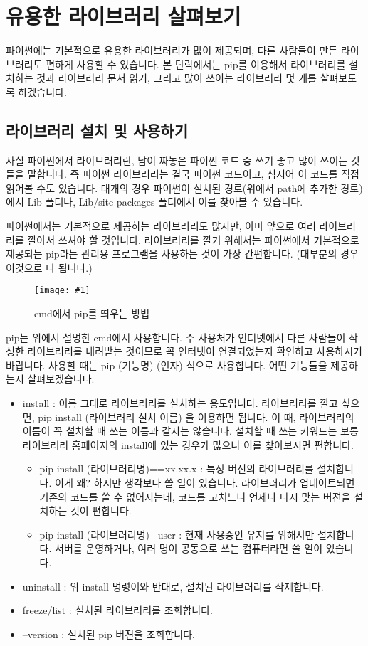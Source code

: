 \documentclass[twoside]{article}
\newcommand\fig[2]{
\begin{figure}[h]
  \centering
  \texttt{[image: \#1]}
  \caption{#2} 
  \label{fig:#1}
\end{figure}
}
\begin{document}
\section{유용한 라이브러리 살펴보기} 

파이썬에는 기본적으로 유용한 라이브러리가 많이 제공되며, 다른 사람들이 만든 라이브러리도 편하게 사용할 수 있습니다. 본 단락에서는 pip를 이용해서 라이브러리를 설치하는 것과 라이브러리 문서 읽기, 그리고 많이 쓰이는 라이브러리 몇 개를 살펴보도록 하겠습니다. 

\subsection{라이브러리 설치 및 사용하기} 

사실 파이썬에서 라이브러리란, 남이 짜놓은 파이썬 코드 중 쓰기 좋고 많이 쓰이는 것들을 말합니다. 즉 파이썬 라이브러리는 결국 파이썬 코드이고, 심지어 이 코드를 직접 읽어볼 수도 있습니다. 대개의 경우 파이썬이 설치된 경로(위에서 path에 추가한 경로)에서 Lib 폴더나, Lib/site-packages 폴더에서 이를 찾아볼 수 있습니다. 

파이썬에서는 기본적으로 제공하는 라이브러리도 많지만, 아마 앞으로 여러 라이브러리를 깔아서 쓰셔야 할 것입니다. 라이브러리를 깔기 위해서는 파이썬에서 기본적으로 제공되는 pip라는 관리용 프로그램을 사용하는 것이 가장 간편합니다. (대부분의 경우 이것으로 다 됩니다.) 

\fig{pip}{cmd에서 pip를 띄우는 방법} 

pip는 위에서 설명한 cmd에서 사용합니다. 주 사용처가 인터넷에서 다른 사람들이 작성한 라이브러리를 내려받는 것이므로 꼭 인터넷이 연결되었는지 확인하고 사용하시기 바랍니다. 사용할 때는 pip (기능명) (인자) 식으로 사용합니다. 어떤 기능들을 제공하는지 살펴보겠습니다. 

\begin{itemize}
\item install : 이름 그대로 라이브러리를 설치하는 용도입니다. 라이브러리를 깔고 싶으면, pip install (라이브러리 설치 이름) 을 이용하면 됩니다. 이 때, 라이브러리의 이름이 꼭 설치할 때 쓰는 이름과 같지는 않습니다. 설치할 때 쓰는 키워드는 보통 라이브러리 홈페이지의 install에 있는 경우가 많으니 이를 찾아보시면 편합니다. 
\begin{itemize}
\item pip install (라이브러리명)==xx.xx.x : 특정 버전의 라이브러리를 설치합니다. 이게 왜? 하지만 생각보다 쓸 일이 있습니다. 라이브러리가 업데이트되면 기존의 코드를 쓸 수 없어지는데, 코드를 고치느니 언제나 다시 맞는 버젼을 설치하는 것이 편합니다. 
\item pip install (라이브러리명) --user : 현재 사용중인 유저를 위해서만 설치합니다. 서버를 운영하거나, 여러 명이 공동으로 쓰는 컴퓨터라면 쓸 일이 있습니다. 
\end{itemize}
\item uninstall : 위 install 명령어와 반대로, 설치된 라이브러리를 삭제합니다. 
\item freeze/list : 설치된 라이브러리를 조회합니다. 
\item --version : 설치된 pip 버젼을 조회합니다.  
\end{itemize}
\end{document}
